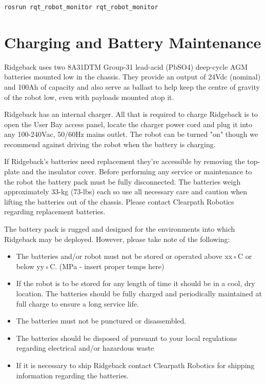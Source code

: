 \documentclass[]{clearpath-latex/clearpath-manual}
\begin{document}
\begin{lstlisting}
rosrun rqt_robot_monitor rqt_robot_monitor
\end{lstlisting}

\section{Charging and Battery Maintenance}

Ridgeback uses two 8A31DTM Group-31 lead-acid (PbSO4) deep-cycle AGM batteries mounted low in the chassis. They provide an output of 24Vdc (nominal) and 100Ah of capacity and also serve as ballast to help keep the centre of gravity of the robot low, even with payloads mounted atop it.

Ridgeback has an internal charger. All that is required to charge Ridgeback is to open the User Bay access panel, locate the charger power cord and plug it into any 100-240Vac, 50/60Hz mains outlet. The robot can be turned "on" though we recommend against driving the robot when the battery is charging.

If Ridgeback's batteries need replacement they're accessible by removing the top-plate and the insulator cover. Before performing any service or maintenance to the robot the battery pack must be fully disconnected. The batteries weigh approximately 33-kg (73-lbs) each so use all necessary care and caution when lifting the batteries out of the chassis. Please contact Clearpath Robotics regarding replacement batteries.

The battery pack is rugged and designed for the environments into which Ridgeback may be deployed. However, please take note of the following:

\begin{itemize}[nolistsep]
	\item The batteries and/or robot must not be stored or operated above xx◦C or below yy◦C. (MPa - insert proper temps here)
	\item If the robot is to be stored for any length of time it should be in a cool, dry location. The batteries should be fully charged and periodically maintained at full charge to ensure a long service life.
	\item The batteries must not be punctured or disassembled.
	\item The batteries should be disposed of pursuant to your local regulations regarding electrical and/or hazardous waste
	\item If it is necessary to ship Ridgeback contact Clearpath Robotics for shipping information regarding the batteries.
\end{itemize}
\end{document}
